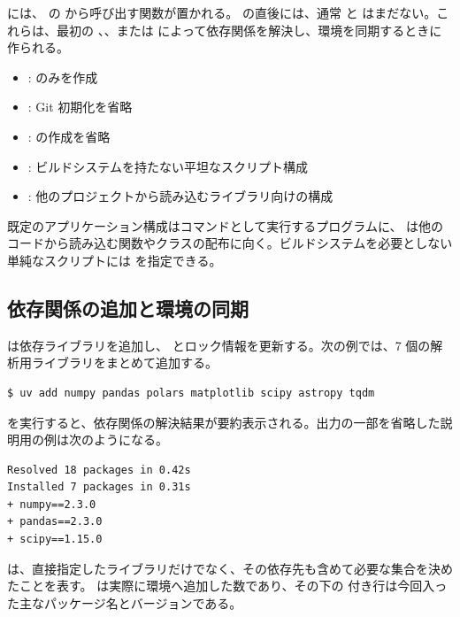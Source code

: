  には、 の  から呼び出す関数が置かれる。 の直後には、通常  と  はまだない。これらは、最初の 、、または  によって依存関係を解決し、環境を同期するときに作られる。

\begin{itemize}
\item {}:  のみを作成
\item {}: Git 初期化を省略
\item {}:  の作成を省略
\item {}: ビルドシステムを持たない平坦なスクリプト構成
\item {}: 他のプロジェクトから読み込むライブラリ向けの構成
\end{itemize}

既定のアプリケーション構成はコマンドとして実行するプログラムに、 は他のコードから読み込む関数やクラスの配布に向く。ビルドシステムを必要としない単純なスクリプトには  を指定できる。

\subsection{依存関係の追加と環境の同期}

 は依存ライブラリを追加し、 とロック情報を更新する。次の例では、7 個の解析用ライブラリをまとめて追加する。

\begin{lstlisting}[numbers=none, xleftmargin=2\zw]
$ uv add numpy pandas polars matplotlib scipy astropy tqdm
\end{lstlisting}

 を実行すると、依存関係の解決結果が要約表示される。出力の一部を省略した説明用の例は次のようになる。

\begin{lstlisting}[numbers=none, xleftmargin=2\zw]
Resolved 18 packages in 0.42s
Installed 7 packages in 0.31s
+ numpy==2.3.0
+ pandas==2.3.0
+ scipy==1.15.0
\end{lstlisting}

 は、直接指定したライブラリだけでなく、その依存先も含めて必要な集合を決めたことを表す。 は実際に環境へ追加した数であり、その下の \code{+} 付き行は今回入った主なパッケージ名とバージョンである。

